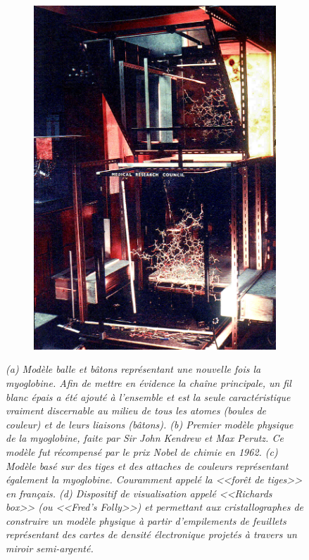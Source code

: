 \begin{figure}
\begin{subfigure}{.5\textwidth}
  {\includegraphics[width=0.9\linewidth]{./figures/ch1/fred_richards_ribonuclease}}
  \caption{}
  \label{Fig:fred_richards_ribonuclease}
  \hspace{0.2cm}
  \end{subfigure}%
  \caption[Différents modèles et techniques physiques de représentation de protéines.]{\it (a) Modèle balle et bâtons représentant une nouvelle fois la myoglobine. Afin de mettre en évidence la chaîne principale, un fil blanc épais a été ajouté à l'ensemble et est la seule caractéristique vraiment discernable au milieu de tous les atomes (boules de couleur) et de leurs liaisons (bâtons).
  (b) Premier modèle physique de la myoglobine, faite par Sir John Kendrew et Max Perutz. Ce modèle fut récompensé par le prix Nobel de chimie en 1962.
  (c) Modèle basé sur des tiges et des attaches de couleurs représentant également la myoglobine. Couramment appelé la <<forêt de tiges>> en français.  
  (d) Dispositif de visualisation appelé <<Richards box>> (ou <<Fred's Folly>>) et permettant aux cristallographes de construire un modèle physique à partir d'empilements de feuillets représentant des cartes de densité électronique projetés à travers un miroir semi-argenté.}
\end{figure}

